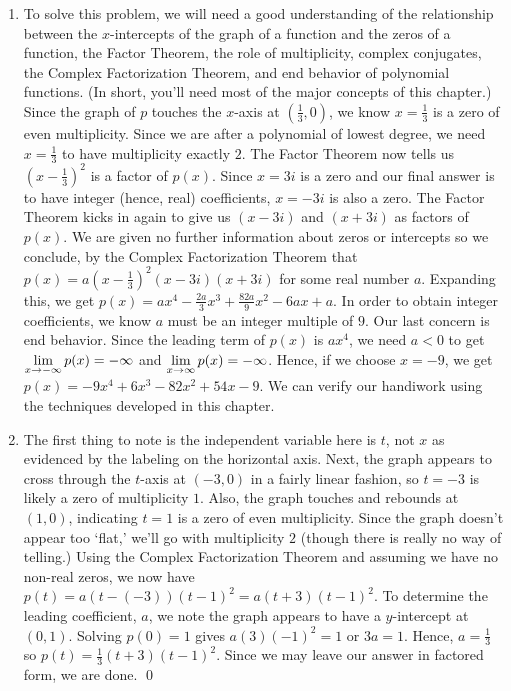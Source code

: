 \documentclass{ximera}
\begin{document}
\begin{ex}
\begin{enumerate}
\item To solve this problem, we will need a good understanding of the relationship between the $x$-intercepts of the graph of a function and the zeros of a function, the Factor Theorem, the role of multiplicity, complex conjugates, the Complex Factorization Theorem, and end behavior of polynomial functions.  (In short, you'll need most of the major concepts of this chapter.)  Since the graph of $p$ touches the $x$-axis at $\left(\frac{1}{3}, 0\right)$, we know $x=\frac{1}{3}$ is a zero of even multiplicity.  Since we are after a polynomial of lowest degree, we need $x=\frac{1}{3}$ to have multiplicity exactly $2$. The Factor Theorem now tells us  $\left(x-\frac{1}{3}\right)^2$ is a factor of $p(x)$.  Since $x=3i$ is a zero and our final answer is to have integer (hence, real) coefficients, $x=-3i$ is also a zero.  The Factor Theorem kicks in again to give us $(x-3i)$ and $(x+3i)$ as factors of $p(x)$.  We are given no further information about zeros or intercepts so we conclude, by the Complex Factorization Theorem that $p(x) = a \left(x-\frac{1}{3}\right)^2 (x-3i)(x+3i)$ for some real number $a$.  Expanding this, we get $p(x) =  ax^4-\frac{2a}{3} x^3+\frac{82a}{9} x^2-6ax+a$.  In order to obtain integer coefficients, we know $a$ must be an integer multiple of $9$.  Our last concern is end behavior.  Since the leading term of $p(x)$ is $ax^4$, we need $a < 0$ to get  $\ds{\lim_{x \rightarrow -\infty} p(x) = -\infty}$    and  $\ds{\lim_{x \rightarrow \infty} p(x) = -\infty}$. Hence, if we choose $x=-9$, we get $p(x) = -9x^4+ 6 x^3 - 82 x^2+54x-9$.    We can verify our handiwork using the techniques developed in this chapter.  

\item The first thing to note is the independent variable here is $t$, not $x$ as evidenced by the labeling on the horizontal axis.   Next, the graph appears to cross through the $t$-axis at $(-3,0)$ in a fairly linear fashion, so $t=-3$ is likely a zero of multiplicity $1$.   Also, the graph touches and rebounds at $(1,0)$, indicating $t=1$ is a zero of even multiplicity.  Since the graph doesn't appear too `flat,' we'll go with multiplicity $2$ (though there is really no way of telling.)     Using the Complex Factorization Theorem and assuming we have no non-real zeros, we now have $p(t) = a (t-(-3))(t-1)^2 = a(t+3)(t-1)^2$.  To determine the leading coefficient, $a$, we note the graph appears to have a $y$-intercept at $(0,1)$.  Solving $p(0) = 1$ gives $a(3)(-1)^2 = 1$ or $3a = 1$.  Hence, $a = \frac{1}{3}$ so $p(t) = \frac{1}{3} (t+3)(t-1)^2$. Since we may leave our answer in factored form, we are done. \qed

\end{enumerate}

\end{ex}
\end{document}
